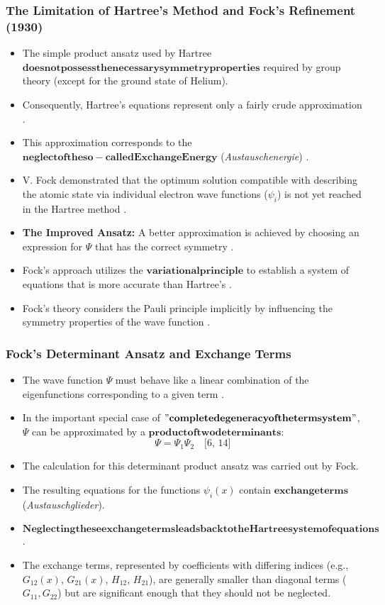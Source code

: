 \begin{frame}
    \frametitle{The Limitation of Hartree's Method and Fock's Refinement (1930)}
    \begin{itemize}
        \item The simple product ansatz  used by Hartree $\mathbf{does not possess the necessary symmetry properties}$ required by group theory (except for the ground state of Helium).
        \item Consequently, Hartree's equations represent only a fairly crude approximation .
        \item This approximation corresponds to the $\mathbf{neglect of the so-called Exchange Energy}$ (\textit{Austauschenergie}) .
        \item V. Fock demonstrated that the optimum solution compatible with describing the atomic state via individual electron wave functions ($\psi_i$) is not yet reached in the Hartree method .
        \item \textbf{The Improved Ansatz:} A better approximation is achieved by choosing an expression for $\Psi$ that has the correct symmetry .
        \item Fock's approach utilizes the $\mathbf{variational principle}$ to establish a system of equations that is more accurate than Hartree's .
        \item Fock's theory considers the Pauli principle implicitly by influencing the symmetry properties of the wave function .
    \end{itemize}
\end{frame}

\begin{frame}
    \frametitle{Fock's Determinant Ansatz and Exchange Terms}
    \begin{itemize}
        \item The wave function $\Psi$ must behave like a linear combination of the eigenfunctions corresponding to a given term .
        \item In the important special case of $\mathbf{"complete degeneracy of the term system"}$, $\Psi$ can be approximated by a $\mathbf{product of two determinants}$:
        $$\Psi = \Psi_1 \Psi_2 \quad \text{[6, 14]}$$
        \item The calculation for this determinant product ansatz was carried out by Fock.
        \item The resulting equations for the functions $\psi_i(x)$ contain $\mathbf{exchange terms}$ (\textit{Austauschglieder}).
        \item $\mathbf{Neglecting these exchange terms leads back to the Hartree system of equations}$.
        \item The exchange terms, represented by coefficients with differing indices (e.g., $G_{12}(x)$, $G_{21}(x)$, $H_{12}$, $H_{21}$), are generally smaller than diagonal terms ($G_{11}, G_{22}$) but are significant enough that they should not be neglected.
    \end{itemize}
\end{frame}

